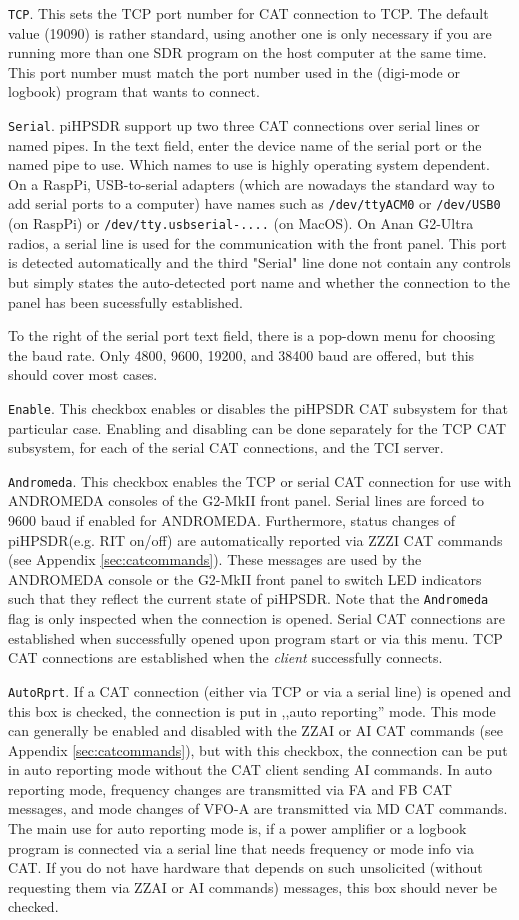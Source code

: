 \documentclass[12pt]{book}
\def\rett#1{\texttt{\color{red}#1}}
\def\pH{pi\-HPSDR\xspace}
\begin{document}
\rett{TCP}. This sets the TCP port number for CAT connection to TCP. The default value (19090)
is rather standard, using another one is only necessary if you are running more than one
SDR program on the host computer at the same time.
This port number must match the port number used in the (digi-mode or logbook) program that wants to connect.

\rett{Serial}. \pH support up two three CAT connections over serial lines or named pipes.
In the text field, enter the device name of the serial port or the named pipe to use.
Which names to use
is highly operating system dependent. On a RaspPi,  USB-to-serial
adapters (which are nowadays the standard way to add serial ports to a computer) have names such as
\texttt{/dev/ttyACM0} or \texttt{/dev/USB0} (on RaspPi) or \texttt{/dev/tty.usbserial-....} (on MacOS).
On Anan G2-Ultra radios, a serial line is used for the communication with the front panel. This
port is detected automatically and the third "Serial" line done not contain any controls but simply
states the auto-detected port name and whether the connection to the panel has been sucessfully
established.


To the right of the serial port text field, there is a pop-down menu for choosing the baud rate. Only 4800,
9600, 19200, and 38400 baud are offered, but this should cover most cases.

\rett{Enable}. This checkbox enables or disables the \pH CAT subsystem for that particular case.
Enabling and disabling can be done separately for the TCP CAT subsystem, for each of the serial
CAT connections, and the TCI server.

\rett{Andromeda}. This checkbox enables the TCP or  serial CAT connection for use with ANDROMEDA consoles
of the G2-MkII front panel. Serial lines are
forced to 9600 baud if enabled for ANDROMEDA. Furthermore, status changes of \pH (e.g. RIT on/off) are
automatically reported via ZZZI CAT commands (see Appendix \ref{sec:catcommands}). These messages are
used by the ANDROMEDA console or the G2-MkII front panel
to switch LED indicators such that they reflect the current state
of \pH. Note that the \rett{Andromeda} flag is only inspected when the connection is opened. Serial CAT connections
are established when successfully opened upon program start or via this menu.
TCP CAT connections are established when the \textit{client} successfully connects.

\rett{AutoRprt}. If a CAT connection (either via TCP or via a serial line) is opened and this box is checked,
the connection is put in ,,auto reporting'' mode. This mode can generally be enabled and disabled with the
ZZAI or AI CAT commands (see Appendix \ref{sec:catcommands}), but with this checkbox, the connection can be put
in auto reporting mode without the CAT client sending AI commands. In auto reporting mode, frequency changes
are transmitted via FA and FB CAT messages, and mode changes of VFO-A are transmitted via MD CAT commands.
The main use for auto reporting mode is, if a power amplifier or a logbook program
is connected via a serial line that needs frequency or mode  info via CAT. If you do not have hardware that depends
on such unsolicited (without requesting them via ZZAI or AI commands) messages, this box should never be checked.
\end{document}
